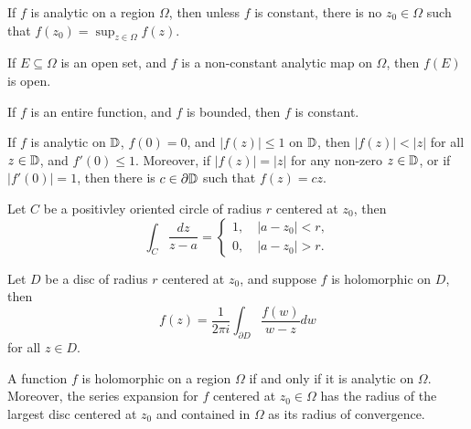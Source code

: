 \documentclass[12pt]{article}
\begin{document}
\begin{theorem}
    If $f$ is analytic on a region $\Omega$, then unless $f$ is constant, there is no $z_0\in\Omega$ such that $f(z_0)=\sup_{z\in\Omega} f(z)$.
\end{theorem}

\begin{theorem}
    If $E\subseteq \Omega$ is an open set, and $f$ is a non-constant analytic map on $\Omega$, then $f(E)$ is open. 
\end{theorem}

\begin{theorem}[Liouville $*$]
    If $f$ is an entire function, and $f$ is bounded, then $f$ is constant.
\end{theorem}

\begin{theorem}
    If $f$ is analytic on $\mathbb{D}$, $f(0)=0$, and $|f(z)|\leq 1$ on $\mathbb{D}$, then $|f(z)|<|z|$ for all $z\in\mathbb{D}$, and $f'(0)\leq 1$. Moreover, if $|f(z)|=|z|$ for any non-zero $z\in \mathbb{D}$, or if $|f'(0)|=1$, then there is $c\in\partial \mathbb{D}$ such that $f(z)=cz$.  
\end{theorem}

\begin{theorem}[$*$]
    Let $C$ be a positivley oriented circle of radius $r$ centered at $z_0$, then
    \begin{equation*}
        \int_C \frac{dz}{z-a}=\begin{cases}
            1,\quad |a-z_0|<r,\\
            0,\quad |a-z_0|>r.
        \end{cases}
    \end{equation*}
\end{theorem}

\begin{theorem}
    Let $D$ be a disc of radius $r$ centered at $z_0$, and suppose $f$ is holomorphic on $D$, then $$f(z)=\frac{1}{2\pi i}\int_{\partial D} \frac{f(w)}{w-z}dw$$ for all $z\in D$. 
\end{theorem}

\begin{theorem}
    A function $f$ is holomorphic on a region $\Omega$ if and only if it is analytic on $\Omega$. Moreover, the series expansion for $f$ centered at $z_0\in \Omega$ has the radius of the largest disc centered at $z_0$ and contained in $\Omega$ as its radius of convergence.
\end{theorem}
\end{document}
